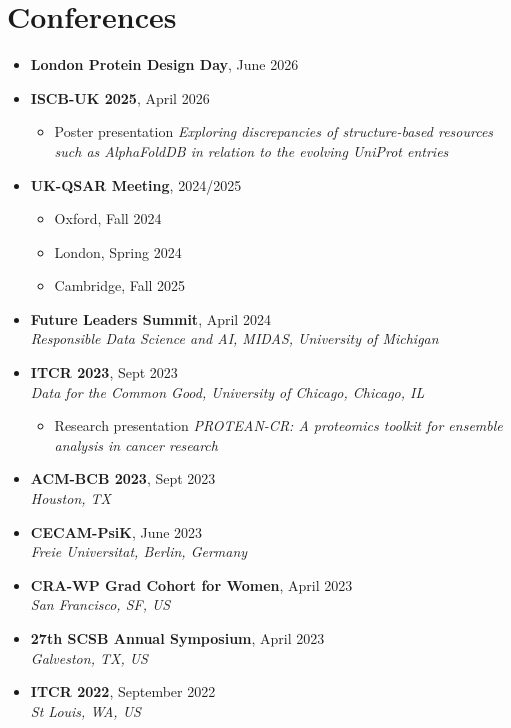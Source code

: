 \documentclass[a4paper,12pt]{article}
\begin{document}

\section{Conferences}

\begin{itemize}
    \item \textbf{London Protein Design Day}, June 2026
    \item \textbf{ISCB-UK 2025}, April 2026
    \begin{itemize}[nosep,after=\strut, leftmargin=1em, itemsep=3pt]
        \item[--] Poster presentation \textit{Exploring discrepancies of structure-based resources such as AlphaFoldDB in relation to the evolving UniProt entries}
    \end{itemize}
    \item \textbf{UK-QSAR Meeting}, 2024/2025
        \begin{itemize}[nosep,after=\strut, leftmargin=1em, itemsep=3pt]
            \item[--] Oxford, Fall 2024
            \item[--] London, Spring 2024
            \item[--] Cambridge, Fall 2025
        \end{itemize}
    \item \textbf{Future Leaders Summit}, April 2024 \\
    \textit{Responsible Data Science and AI, MIDAS, University of Michigan}
    \item \textbf{ITCR 2023}, Sept 2023 \\
    \textit{Data for the Common Good, University of Chicago, Chicago, IL}
        \begin{itemize}[nosep,after=\strut, leftmargin=1em, itemsep=3pt]
            \item[--] Research presentation \textit{PROTEAN-CR: A proteomics toolkit for ensemble analysis in cancer research}
        \end{itemize}
    \item \textbf{ACM-BCB 2023}, Sept 2023 \\
    \textit{Houston, TX}
    \item \textbf{CECAM-PsiK}, June 2023 \\
    \textit{Freie Universitat, Berlin, Germany}
    \item \textbf{CRA-WP Grad Cohort for Women}, April 2023 \\
    \textit{San Francisco, SF, US}
    \item \textbf{27th SCSB Annual Symposium}, April 2023 \\
    \textit{Galveston, TX, US}
    \item \textbf{ITCR 2022}, September 2022 \\
    \textit{St Louis, WA, US}
\end{itemize}
\end{document}
